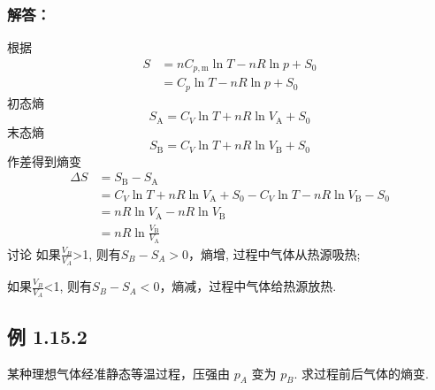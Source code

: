 \subsubsection{解答：}
根据
\begin{equation}
    \begin{aligned}
        S&=nC_{p,\mathrm{m}}\ln T-nR\ln p+S_0
\\
&=C_p\ln T-nR\ln p+S_0
    \end{aligned}
\end{equation}
初态熵
\begin{equation}
    S_{\mathrm{A}}=C_V\ln T+nR\ln V_{\mathrm{A}}+S_0
\end{equation}
末态熵
\begin{equation}
    S_{\mathrm{B}}=C_V\ln T+nR\ln V_{\mathrm{B}}+S_0
\end{equation}
作差得到熵变
\begin{equation}
    \begin{aligned}
        \Delta S&=S_{\mathrm{B}}-S_{\mathrm{A}}
\\
&=C_V\ln T+nR\ln V_{\mathrm{A}}+S_0-C_V\ln T-nR\ln V_{\mathrm{B}}-S_0
\\
&=nR\ln V_{\mathrm{A}}-nR\ln V_{\mathrm{B}}
\\
&=nR\ln \frac{V_{\mathrm{B}}}{V_{\mathrm{A}}}
    \end{aligned}
\end{equation}
讨论
如果$\frac{V_{B}}{V_{A}}$>1, 则有$S_{B}-S_{A}>0$，熵增, 过程中气体从热源吸热; 

如果$\frac{V_{B}}{V_{A}}$<1, 则有$S_{B}-S_{A}<0$，熵减，过程中气体给热源放热.

\subsection{例 1.15.2 }
某种理想气体经准静态等温过程，压强由 $p_{A}$ 变为 $p_{B}$. 求过程前后气体的熵变.

